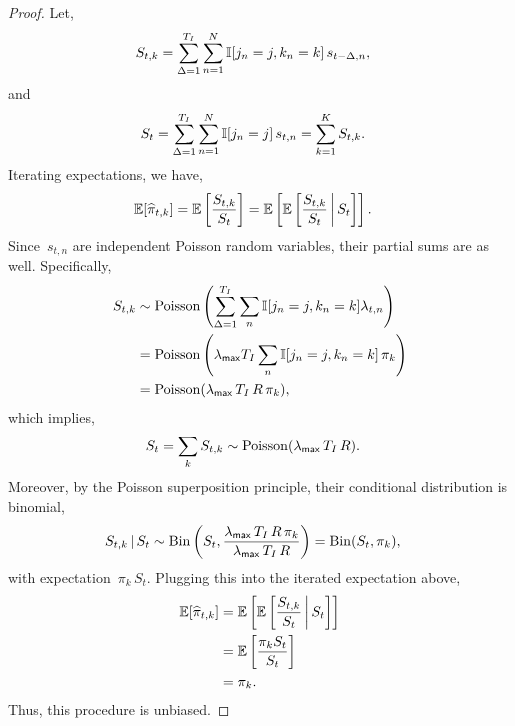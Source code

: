\begin{proof}
  Let,
  \begin{align*}
    S_{t,k} &= \sum_{\Delta = 1}^{T_I} \sum_{n=1}^N \mathbb{I}[j_n=j, k_n=k] \, s_{t-\Delta,n},
  \end{align*}
  and
  \begin{align*}
    S_{t} &= \sum_{\Delta = 1}^{T_I} \sum_{n=1}^N \mathbb{I}[j_n=j] \,  s_{t,n} = \sum_{k=1}^K S_{t,k}.
  \end{align*}
  Iterating expectations, we have,
  \begin{align*}
    \mathbb{E}[\widehat{\pi}_{t,k}] &=
    \mathbb{E} \left[ \frac{S_{t, k}}{S_{t}} \right]
    = \mathbb{E} \left[
      \mathbb{E} \left[
        \frac{S_{t,k}}{S_t} \, \bigg|\, S_{t}  
      \right] \right].
  \end{align*}
  Since~$s_{t, n}$ are independent Poisson random variables, their partial
  sums are as well.  Specifically,
  \begin{align}
    \nonumber
    S_{t,k} &\sim \mathrm{Poisson} \left( \sum_{\Delta = 1}^{T_I} \sum_{n} \mathbb{I}[j_n=j, k_n=k] \lambda_{t,n} \right) \\
    \nonumber
    &= \mathrm{Poisson} \left(\lambda_{\mathsf{max}} T_I \sum_n \mathbb{I}[j_n=j, k_n=k] \, \pi_{k} \right) \\
    \label{eq:S_t_rate}
    &= \mathrm{Poisson}(\lambda_{\mathsf{max}} \, T_I \, R \, \pi_{k}),
  \end{align}
  which implies,
  \begin{align*}
    S_{t} = \sum_{k} S_{t,k} &\sim \mathrm{Poisson}(\lambda_{\mathsf{max}} \, T_I \, R).
  \end{align*}
  Moreover, by the Poisson superposition principle, their conditional
  distribution is binomial,
  \begin{align*}
    S_{t,k} \,|\, S_t &\sim
    \mathrm{Bin} \left( S_t, \frac{\lambda_{\mathsf{max}} \, T_I \, R \, \pi_{k}}{\lambda_{\mathsf{max}} \, T_I \, R} \right)
    =\mathrm{Bin}(S_t, \pi_{k}),
  \end{align*}
  with expectation~$\pi_{k} \, S_t$.
  Plugging this into the iterated expectation above, 
  \begin{align*}
    \mathbb{E}[\widehat{\pi}_{t,k}]
    &= \mathbb{E} \left[
      \mathbb{E} \left[
        \frac{S_{t,k}}{S_t} \, \bigg|\, S_t  \right] \right] \\
    &= \mathbb{E} \left[ 
      \frac{\pi_{k} S_t}{S_t} \right]\\
    &= \pi_{k}.
  \end{align*}
  Thus, this procedure is unbiased.
\end{proof}


